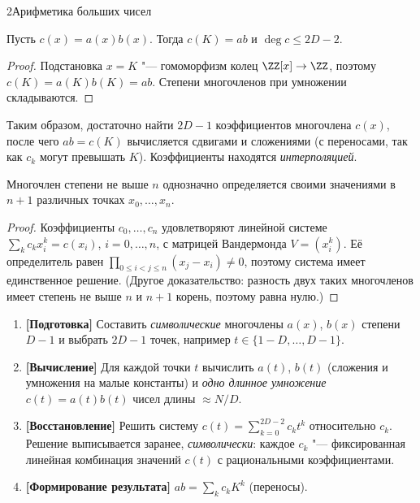 \begin{lecture}{2}{Арифметика больших чисел}
\begin{lemma}\label{l2:eval}
Пусть $c(x) = a(x) b(x)$. Тогда $c(K) = ab$ и $\deg c \le 2D - 2$.
\end{lemma}

\begin{proof}
Подстановка $x = K$ "--- гомоморфизм колец $\ZZ[x] \to \ZZ$, поэтому $c(K) = a(K) b(K) = ab$.
Степени многочленов при умножении складываются.
\end{proof}

Таким образом, достаточно найти $2D - 1$ коэффициентов многочлена $c(x)$, после чего
$ab = c(K)$ вычисляется сдвигами и сложениями (с переносами, так как $c_k$ могут превышать $K$).
Коэффициенты находятся \emph{интерполяцией}.

\begin{theorem}\label{l2:interp}
Многочлен степени не выше $n$ однозначно определяется своими значениями в $n + 1$ различных
точках $x_0, \dots, x_n$.
\end{theorem}

\begin{proof}
Коэффициенты $c_0, \dots, c_n$ удовлетворяют линейной системе $\sum_k c_k x_i^k = c(x_i)$,
$i = 0, \dots, n$, с матрицей Вандермонда $V = (x_i^k)$. Её определитель равен
$\prod_{0 \le i < j \le n} (x_j - x_i) \ne 0$, поэтому система имеет единственное решение.
(Другое доказательство: разность двух таких многочленов имеет степень не выше $n$ и $n + 1$
корень, поэтому равна нулю.)
\end{proof}

\begin{algorithm}
\begin{enumerate}
  \item \textbf{[Подготовка]} Составить \emph{символические} многочлены $a(x)$, $b(x)$ степени
    $D - 1$ и выбрать $2D - 1$ точек, например $t \in \{1 - D, \dots, D - 1\}$.
  \item \textbf{[Вычисление]} Для каждой точки $t$ вычислить $a(t)$, $b(t)$ (сложения
    и умножения на малые константы) и \emph{одно длинное умножение} $c(t) = a(t) b(t)$
    чисел длины $\approx N/D$.
  \item \textbf{[Восстановление]} Решить систему $c(t) = \sum_{k=0}^{2D-2} c_k t^k$ относительно
    $c_k$. Решение выписывается заранее, \emph{символически}: каждое $c_k$ "--- фиксированная
    линейная комбинация значений $c(t)$ с рациональными коэффициентами.
  \item \textbf{[Формирование результата]} $ab = \sum_k c_k K^k$ (переносы).
\end{enumerate}
\end{algorithm}


\end{lecture}
